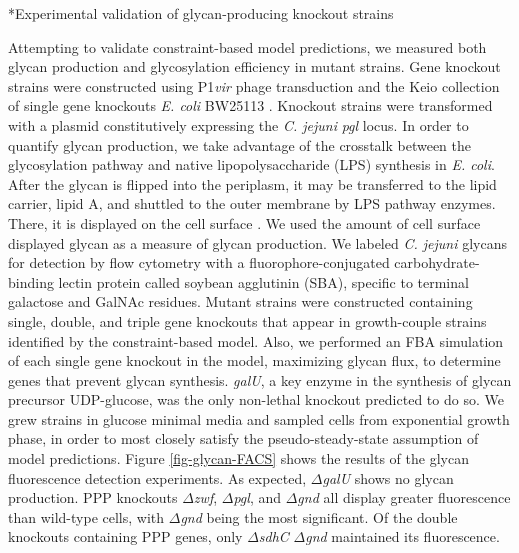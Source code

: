 \documentclass[12pt]{article}
\makeatletter
\renewcommand\subsection{\@startsection
	{subsection}{2}{0mm}
	{-0.05in}
	{-0.5\baselineskip}
	{\normalfont\normalsize\bfseries}}
\makeatother
\begin{document}
\subsection*{Experimental validation of glycan-producing knockout strains}

Attempting to validate constraint-based model predictions, we measured both glycan production and glycosylation efficiency in mutant strains. 
Gene knockout strains were constructed using P1\textit{vir} phage transduction and the Keio collection of single gene knockouts \textit{E. coli} BW25113 \cite{2006-baba-tomita-mori-MolSysBio}. 
Knockout strains were transformed with a plasmid constitutively expressing the \textit{C. jejuni} \textit{pgl} locus. 
In order to quantify glycan production, we take advantage of the crosstalk between the glycosylation pathway and native lipopolysaccharide (LPS) synthesis in \textit{E. coli}. 
After the glycan is flipped into the periplasm, it may be transferred to the lipid carrier, lipid A, and shuttled to the outer membrane by LPS pathway enzymes. 
There, it is displayed on the cell surface \cite{2013-merritt-fisher-delisa-BiotechBioeng}. 
We used the amount of cell surface displayed glycan as a measure of glycan production. 
We labeled \textit{C. jejuni} glycans for detection by flow cytometry with a fluorophore-conjugated carbohydrate-binding lectin protein called soybean agglutinin (SBA), specific to terminal galactose and GalNAc residues. 
Mutant strains were constructed containing single, double, and triple gene knockouts that appear in growth-couple strains identified by the constraint-based model. 
Also, we performed an FBA simulation of each single gene knockout in the model, maximizing glycan flux, to determine genes that prevent glycan synthesis. 
\textit{galU}, a key enzyme in the synthesis of glycan precursor UDP-glucose, was the only non-lethal knockout predicted to do so. 
We grew strains in glucose minimal media and sampled cells from exponential growth phase, in order to most closely satisfy the pseudo-steady-state assumption of model predictions. 
Figure \ref{fig-glycan-FACS} shows the results of the glycan fluorescence detection experiments. 
As expected, $\Delta$\textit{galU} shows no glycan production. 
PPP knockouts $\Delta$\textit{zwf}, $\Delta$\textit{pgl}, and $\Delta$\textit{gnd} all display greater fluorescence than wild-type cells, with $\Delta$\textit{gnd} being the most significant. 
Of the double knockouts containing PPP genes, only $\Delta$\textit{sdhC} $\Delta$\textit{gnd} maintained its fluorescence. 
\end{document}
